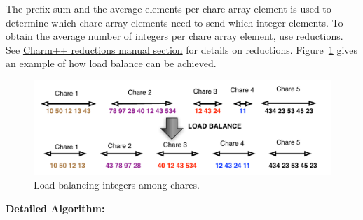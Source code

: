 \documentclass{article}
\begin{document}
The prefix sum and the average elements per chare array element is used to
determine which chare array elements need to send which integer elements.  To
obtain the average number of integers per chare array element, use reductions.
See
\href{http://charm.cs.uiuc.edu/manuals/html/charm++/4.html#SECTION01361000000000000000}{Charm++
reductions manual section} for details on reductions. Figure~\ref{prefix} gives
an example of how load balance can be achieved. 



\begin{figure}[h]
\centering
\includegraphics[width=\textwidth]{prob1.pdf}
\caption{Load balancing integers among chares.}
\label{prefix}
\end{figure}


\textbf{Detailed Algorithm:} 
\end{document}
